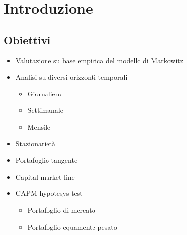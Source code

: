 \documentclass[compress]{beamer}
\begin{document}
\begin{frame}[plain]
	\titlepage
\end{frame}
\section{Introduzione}

\subsection{Obiettivi}
\begin{frame}{\subsecname}
	\begin{itemize}
		\item Valutazione su base empirica del modello di Markowitz
		\item Analisi su diversi orizzonti temporali
		      \begin{itemize}
			      \item Giornaliero
			      \item Settimanale
			      \item Mensile
		      \end{itemize}
		\item Stazionarietà
		\item Portafoglio tangente
		\item Capital market line
		\item CAPM hypotesys test
		\begin{itemize}
			\item Portafoglio di mercato
			\item Portafoglio equamente pesato
		\end{itemize}
	\end{itemize}

\end{frame}
\end{document}
